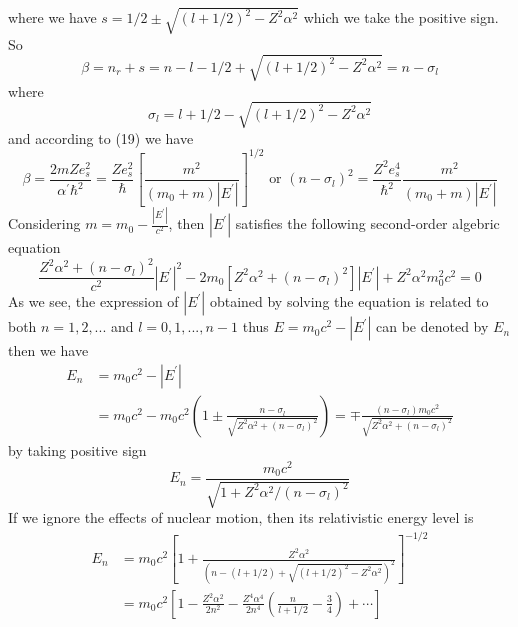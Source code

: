 \documentclass{article}
\begin{document}
where we have \(s=1 / 2 \pm \sqrt{(l+1 / 2)^{2}-Z^{2} \alpha^{2}}\) which we take the positive sign. So 
\begin{equation}
\beta=n_{r}+s=n-l-1 / 2+\sqrt{(l+1 / 2)^{2}-Z^{2} \alpha^{2}}=n-\sigma_{l}
\end{equation}
where
\begin{equation}
\sigma_{l}=l+1 / 2-\sqrt{(l+1 / 2)^{2}-Z^{2} \alpha^{2}}
\end{equation} 
and according to (19) we have 
\begin{equation}
\beta=\frac{2 m Z e_{s}^{2}}{\alpha^{\prime} \hbar^{2}}=\frac{Z e_{s}^{2}}{\hbar}\left[\frac{m^{2}}{\left(m_{0}+m\right)\left|E^{\prime}\right|}\right]^{1 / 2} \text { or }\left(n-\sigma_{l}\right)^{2}=\frac{Z^{2} e_{s}^{4}}{\hbar^{2}} \frac{m^{2}}{\left(m_{0}+m\right)\left|E^{\prime}\right|}
\end{equation}
Considering \(m=m_{0}-\frac{|E^{\prime}|}{c^{2}}\), then \(|E^{\prime}|\) satisfies the following second-order algebric equation
\begin{equation}
\frac{Z^{2} \alpha^{2}+\left(n-\sigma_{l}\right)^{2}}{c^{2}}\left|E^{\prime}\right|^{2}-2 m_{0}\left[Z^{2} \alpha^{2}+\left(n-\sigma_{l}\right)^{2}\right]\left|E^{\prime}\right|+Z^{2} \alpha^{2} m_{0}^{2} c^{2}=0
\end{equation}
As we see, the expression of \(|E^{\prime}|\) obtained by solving the equation is related to both \(n=1,2,... \) and \(l=0,1,...,n-1 \) thus \(E=m_{0}c^{2}-|E^{\prime}|\) can be denoted by \(E_{n}\) then we have 
\begin{equation}
\begin{aligned} E_{n} &=m_{0} c^{2}-\left|E^{\prime}\right| \\ &=m_{0} c^{2}-m_{0} c^{2}\left(1 \pm \frac{n-\sigma_{l}}{\sqrt{Z^{2} \alpha^{2}+\left(n-\sigma_{l}\right)^{2}}}\right)=\mp \frac{\left(n-\sigma_{l}\right) m_{0} c^{2}}{\sqrt{Z^{2} \alpha^{2}+\left(n-\sigma_{l}\right)^{2}}}
\end{aligned}
\end{equation}
by taking positive sign 
\begin{equation}
E_{n}=\frac{m_{0} c^{2}}{\sqrt{1+Z^{2} \alpha^{2} /\left(n-\sigma_{l}\right)^{2}}}
\end{equation}
If we ignore the effects of nuclear motion, then its relativistic energy level is 
\begin{equation}
\begin{aligned} E_{n} &=m_{0} c^{2}\left[1+\frac{Z^{2} \alpha^{2}}{(n-(l+1 / 2)+\sqrt{(l+1 / 2)^{2}-Z^{2} \alpha^{2}})^{2}}\right]^{-1 / 2} \\ &=m_{0} c^{2}\left[1-\frac{Z^{2} \alpha^{2}}{2 n^{2}}-\frac{Z^{4} \alpha^{4}}{2 n^{4}}\left(\frac{n}{l+1 / 2}-\frac{3}{4}\right)+\cdots\right] 
\end{aligned}
\end{equation}
\end{document}
